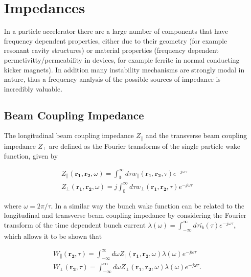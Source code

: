 \section{Impedances}

In a particle accelerator there are a large number of components that have frequency dependent properties, either due to their geometry (for example resonant cavity structures) or material properties (frequency dependent permetivitty/permeability in devices, for example ferrite in normal conducting kicker magnets). In addition many instability mechanisms are strongly modal in nature, thus a frequency analysis of the possible sources of impedance is incredibly valuable. 

\subsection{Beam Coupling Impedance}

The longitudinal beam coupling impedance $Z_{\parallel}$ and the transverse beam coupling impedance $Z_{\perp}$ are defined as the Fourier transforms of the single particle wake function, given by

\begin{align}
Z_{\parallel} \left(\mathbf{r_{1}}, \mathbf{r_{2}}, \omega  \right) = \int^{\infty}_{0} d\tau w_{\parallel} \left(\mathbf{r_{1}}, \mathbf{r_{2}}, \tau  \right) e^{-j\omega \tau}\\
Z_{\perp} \left(\mathbf{r_{1}}, \mathbf{r_{2}}, \omega  \right) = j \int^{\infty}_{0} d\tau w_{\perp} \left(\mathbf{r_{1}}, \mathbf{r_{2}}, \tau  \right) e^{-j\omega \tau} \label{eqn:total_trans_imp}
\end{align}

where $\omega = 2\pi / \tau$. In a similar way the bunch wake function can be related to the longitudinal and transverse beam coupling impedance by considering the Fourier transform of the time dependent bunch current $\lambda \left( \omega  \right) = \int^{\infty}_{-\infty} d\tau i_{b}\left( \tau \right) e^{-j \omega \tau}$, which allows it to be shown that

\begin{align}
W_{\parallel}  \left( \mathbf{r_{2}}, \tau \right) = \int^{\infty}_{- \infty} d \omega Z_{\parallel} \left(\mathbf{r_{1}}, \mathbf{r_{2}}, \omega  \right) \lambda \left( \omega  \right) e^{-j \omega \tau} \\
W_{\perp}  \left( \mathbf{r_{2}}, \tau \right) = \int^{\infty}_{- \infty} d \omega Z_{\perp} \left(\mathbf{r_{1}}, \mathbf{r_{2}}, \omega  \right) \lambda \left( \omega  \right) e^{-j \omega \tau}.
\end{align}

